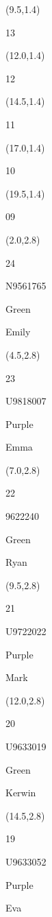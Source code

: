 \documentclass[a4paper]{article}
\newcommand{\myseat}[5]{%
\vspace{-0.1cm} \hspace{-0.5cm}
\parbox[t][2.2cm][t]{3.5cm}{%
\small #1 %
\begin{description}
\vspace{-0.1cm}
\item [ID:] #2
\vspace{-0.1cm}
\item [Team:] #3 \normalsize
\vspace{-0.1cm}
\item \normalsize #4 #5
\vspace{-0.1cm}
\end{description}
}
}
\begin{document}
\begin{CJK}{UTF8}{cyberbit}
\begin{textblock}{2.5}(9.5,1.4)
\textblockcolor{}
\myseat{13}{}{}{}{}
\end{textblock}

\begin{textblock}{2.5}(12.0,1.4)
\textblockcolor{}
\myseat{12}{}{}{}{}
\end{textblock}

\begin{textblock}{2.5}(14.5,1.4)
\textblockcolor{}
\myseat{11}{}{}{}{}
\end{textblock}

\begin{textblock}{2.5}(17.0,1.4)
\textblockcolor{}
\myseat{10}{}{}{}{}
\end{textblock}

\begin{textblock}{2.5}(19.5,1.4)
\textblockcolor{}
\myseat{09}{}{}{}{}
\end{textblock}


\begin{textblock}{2.5}(2.0,2.8)
\myseat{24}{N9561765}{Green}{Emily}{}
\end{textblock}

\begin{textblock}{2.5}(4.5,2.8)
\myseat{23}{U9818007}{Purple}{Emma}{}
\end{textblock}

\begin{textblock}{2.5}(7.0,2.8)
\myseat{22}{9622240}{Green}{Ryan}{}
\end{textblock}

\begin{textblock}{2.5}(9.5,2.8)
\myseat{21}{U9722022}{Purple}{Mark}{}
\end{textblock}

\begin{textblock}{2.5}(12.0,2.8)
\myseat{20}{U9633019}{Green}{Kerwin}{}
\end{textblock}

\begin{textblock}{2.5}(14.5,2.8)
\myseat{19}{U9633052}{Purple}{Eva}{}
\end{textblock}


\end{CJK}
\end{document}
